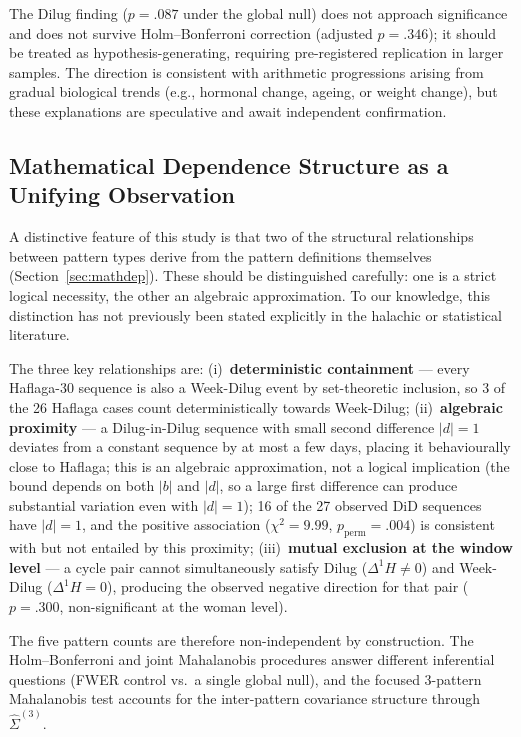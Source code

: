 \documentclass[12pt]{article}
\begin{document}
The Dilug finding ($p = .087$ under the global null) does not approach significance
and does not survive Holm--Bonferroni correction (adjusted $p = .346$); it should be
treated as hypothesis-generating, requiring pre-registered replication in larger
samples. The direction is consistent with arithmetic progressions arising from
gradual biological trends (e.g., hormonal change, ageing, or weight change), but
these explanations are speculative and await independent confirmation.

\subsection{Mathematical Dependence Structure as a Unifying Observation}

A distinctive feature of this study is that two of the structural relationships between
pattern types derive from the pattern definitions themselves (Section~\ref{sec:mathdep}).
These should be distinguished carefully: one is a strict logical necessity, the other
an algebraic approximation. To our knowledge, this distinction has not previously been
stated explicitly in the halachic or statistical literature.

The three key relationships are: (i)~\textbf{deterministic containment} --- every Haflaga-30
sequence is also a Week-Dilug event by set-theoretic inclusion, so 3 of the 26 Haflaga
cases count deterministically towards Week-Dilug; (ii)~\textbf{algebraic proximity}
--- a Dilug-in-Dilug sequence with small second difference $|d| = 1$ deviates from
a constant sequence by at most a few days, placing it behaviourally close to Haflaga;
this is an algebraic approximation, not a logical implication (the bound depends on
both $|b|$ and $|d|$, so a large first difference can produce substantial variation
even with $|d| = 1$); 16 of the 27 observed DiD sequences have $|d| = 1$, and the
positive association ($\chi^2 = 9.99$, $p_{\text{perm}} = .004$) is consistent with
but not entailed by this proximity; (iii)~\textbf{mutual exclusion at the
window level} --- a cycle pair cannot simultaneously satisfy Dilug ($\Delta^1 H \neq 0$)
and Week-Dilug ($\Delta^1 H = 0$), producing the observed negative direction for
that pair ($p = .300$, non-significant at the woman level).

The five pattern counts are therefore non-independent by construction. The Holm--Bonferroni and joint Mahalanobis procedures answer different inferential questions (FWER control vs.\ a single global null), and the focused 3-pattern Mahalanobis test accounts for the inter-pattern covariance structure through $\hat{\Sigma}^{(3)}$.
\end{document}
